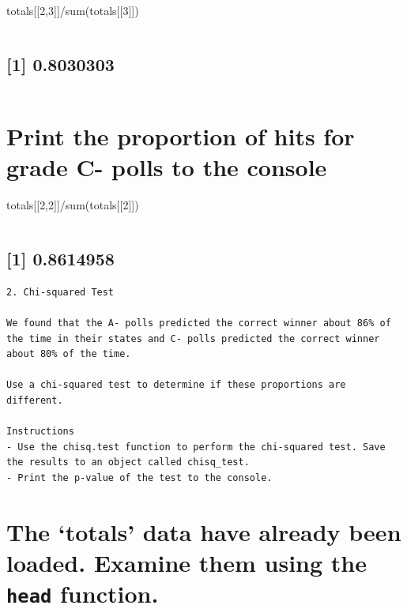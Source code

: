 \documentclass[
]{article}
\begin{document}
totals{[}{[}2,3{]}{]}/sum(totals{[}{[}3{]}{]})

\begin{verbatim}
\end{verbatim}

\hypertarget{section-4}{%
\subsection{{[}1{]} 0.8030303}\label{section-4}}

\begin{verbatim}
\end{verbatim}

\hypertarget{print-the-proportion-of-hits-for-grade-c--polls-to-the-console}{%
\section{Print the proportion of hits for grade C- polls to the
console}\label{print-the-proportion-of-hits-for-grade-c--polls-to-the-console}}

totals{[}{[}2,2{]}{]}/sum(totals{[}{[}2{]}{]})

\begin{verbatim}
\end{verbatim}

\hypertarget{section-5}{%
\subsection{{[}1{]} 0.8614958}\label{section-5}}

\begin{verbatim}
2. Chi-squared Test

We found that the A- polls predicted the correct winner about 86% of the time in their states and C- polls predicted the correct winner about 80% of the time.

Use a chi-squared test to determine if these proportions are different.

Instructions
- Use the chisq.test function to perform the chi-squared test. Save the results to an object called chisq_test.
- Print the p-value of the test to the console.
\end{verbatim}

\hypertarget{the-totals-data-have-already-been-loaded.-examine-them-using-the-head-function.}{%
\section{\texorpdfstring{The `totals' data have already been loaded.
Examine them using the \texttt{head}
function.}{The `totals' data have already been loaded. Examine them using the head function.}}\label{the-totals-data-have-already-been-loaded.-examine-them-using-the-head-function.}}
\end{document}
